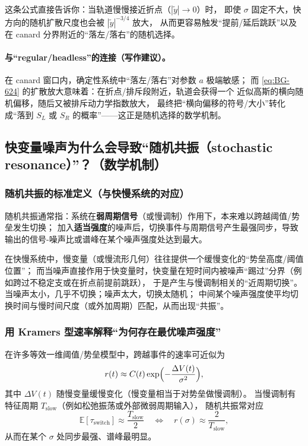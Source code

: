 \documentclass[a4paper,twoside,openany,UTF8]{article}  %
\numberwithin{equation}{section}  %
\numberwithin{equation}{section}  %
\begin{document}
这条公式直接告诉你：当轨道慢慢接近折点（$|\tilde y|\to0$）时，
即使 $\sigma$ 固定不大，快方向的随机扩散尺度也会被 $|\tilde y|^{-3/4}$ 放大，
从而更容易触发“提前/延后跳跃”以及在 canard 分界附近的“落左/落右”的随机选择。

\paragraph{与“regular/headless”的连接（写作建议）。}
在 canard 窗口内，确定性系统中“落左/落右”对参数 $a$ 极端敏感；
而 \eqref{eq:BG-624} 的扩散放大意味着：在折点/排斥段附近，轨道会获得一个
近似高斯的横向随机偏移，随后又被排斥动力学指数放大，
最终把“横向偏移的符号/大小”转化成“落到 $S_L$ 或 $S_R$ 的概率”——这正是随机选择的数学机制。

\subsection{快变量噪声为什么会导致“随机共振（stochastic resonance）”？（数学机制）}

\subsubsection{随机共振的标准定义（与快慢系统的对应）}
随机共振通常指：系统在\textbf{弱周期信号}（或慢调制）作用下，本来难以跨越阈值/势垒发生切换；
加入\textbf{适当强度}的噪声后，切换事件与周期信号产生最强同步，导致输出的信号-噪声比或谱峰在某个噪声强度处达到最大。

在快慢系统中，慢变量（或慢流形几何）往往提供一个缓慢变化的“势垒高度/阈值位置”；
而当噪声直接作用于快变量时，快变量在短时间内被噪声“踢过”分界（例如跨过不稳定支或在折点前提前跳跃），
于是产生与慢调制相关的“近周期切换”。当噪声太小，几乎不切换；噪声太大，切换太随机；
中间某个噪声强度使平均切换时间与慢时间尺度（或外加周期）匹配，从而出现“共振”。

\subsubsection{用 Kramers 型速率解释“为何存在最优噪声强度”}
在许多等效一维阈值/势垒模型中，跨越事件的速率可近似为
\[
r(t)\approx C(t)\exp\Bigl(-\frac{\Delta V(t)}{\sigma^2}\Bigr),
\]
其中 $\Delta V(t)$ 随慢变量缓慢变化（慢变量相当于对势垒做慢调制）。
当慢调制有特征周期 $T_{\mathrm{slow}}$（例如松弛振荡或外部微弱周期输入），
随机共振常对应
\[
\mathbb E[\tau_{\mathrm{switch}}]\approx \frac{T_{\mathrm{slow}}}{2}
\quad\Longleftrightarrow\quad
r(\sigma)\approx \frac{2}{T_{\mathrm{slow}}},
\]
从而在某个 $\sigma$ 处同步最强、谱峰最明显。
\end{document}
